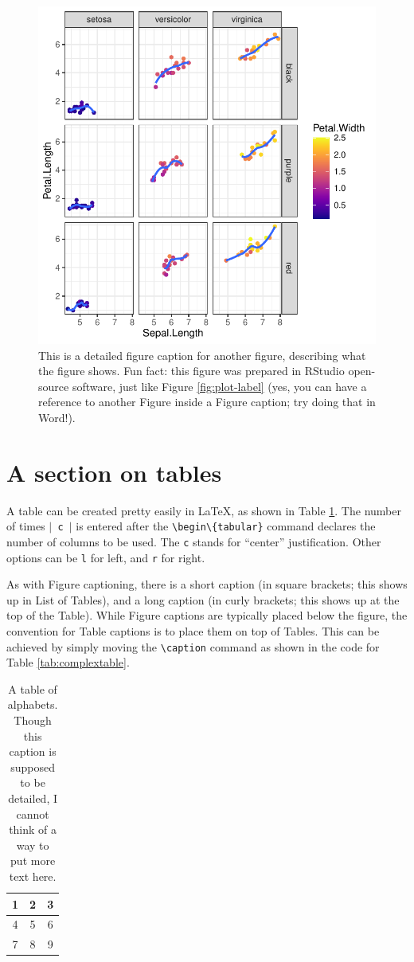 \begin{figure}[!h]
\centering
\includegraphics[width=0.7\linewidth]{"ch01/Some_Other_Plot"}
\caption[Another figure]{This is a detailed figure caption for another figure, describing what the figure shows. Fun fact: this figure was prepared in RStudio open-source software, just like Figure \ref{fig:plot-label} (yes, you can have a reference to another Figure inside a Figure caption; try doing that in Word!).}
\label{fig:plot2-label}
\end{figure}

\section{A section on tables}\label{tables-sec}
A table can be created pretty easily in \LaTeX{}, as shown in Table \ref{tab:simpletable}. The number of times $\vert$\verb| c |$\vert$ is entered after the \verb|\begin\{tabular}| command declares the number of columns to be used. The \verb|c| stands for ``center'' justification. Other options can be \verb|l| for left, and \verb|r| for right.

As with Figure captioning, there is a short caption (in square brackets; this shows up in List of Tables), and a long caption (in curly brackets; this shows up at the top of the Table). While Figure captions are typically placed below the figure, the convention for Table captions is to place them on top of Tables. This can be achieved by simply moving the \verb|\caption| command as shown in the code for Table \ref{tab:complextable}.

\begin{table}[!h]
\begin{center}
  \begin{tabular}{| c | c | c |}
    \hline
    1 & 2 & 3 \\ \hline
    4 & 5 & 6 \\ \hline
    7 & 8 & 9 \\
    \hline
  \end{tabular}
\caption[A small, simple table]{A table of alphabets. Though this caption is supposed to be detailed, I cannot think of a way to put more text here.}
\label{tab:simpletable}
\end{center}
\end{table}

